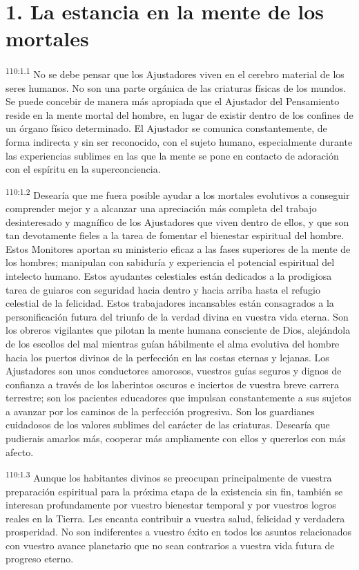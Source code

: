 \documentclass[twoside, 11pt]{book}
\begin{document}
\section*{1. La estancia en la mente de los mortales}
\par
\textsuperscript{110:1.1} No se debe pensar que los Ajustadores viven en el cerebro material de los seres humanos. No son una parte orgánica de las criaturas físicas de los mundos. Se puede concebir de manera más apropiada que el Ajustador del Pensamiento reside en la mente mortal del hombre, en lugar de existir dentro de los confines de un órgano físico determinado. El Ajustador se comunica constantemente, de forma indirecta y sin ser reconocido, con el sujeto humano, especialmente durante las experiencias sublimes en las que la mente se pone en contacto de adoración con el espíritu en la superconciencia.

\par
\textsuperscript{110:1.2} Desearía que me fuera posible ayudar a los mortales evolutivos a conseguir comprender mejor y a alcanzar una apreciación más completa del trabajo desinteresado y magnífico de los Ajustadores que viven dentro de ellos, y que son tan devotamente fieles a la tarea de fomentar el bienestar espiritual del hombre. Estos Monitores aportan su ministerio eficaz a las fases superiores de la mente de los hombres; manipulan con sabiduría y experiencia el potencial espiritual del intelecto humano. Estos ayudantes celestiales están dedicados a la prodigiosa tarea de guiaros con seguridad hacia dentro y hacia arriba hasta el refugio celestial de la felicidad. Estos trabajadores incansables están consagrados a la personificación futura del triunfo de la verdad divina en vuestra vida eterna. Son los obreros vigilantes que pilotan la mente humana consciente de Dios, alejándola de los escollos del mal mientras guían hábilmente el alma evolutiva del hombre hacia los puertos divinos de la perfección en las costas eternas y lejanas. Los Ajustadores son unos conductores amorosos, vuestros guías seguros y dignos de confianza a través de los laberintos oscuros e inciertos de vuestra breve carrera terrestre; son los pacientes educadores que impulsan constantemente a sus sujetos a avanzar por los caminos de la perfección progresiva. Son los guardianes cuidadosos de los valores sublimes del carácter de las criaturas. Desearía que pudierais amarlos más, cooperar más ampliamente con ellos y quererlos con más afecto.

\par
\textsuperscript{110:1.3} Aunque los habitantes divinos se preocupan principalmente de vuestra preparación espiritual para la próxima etapa de la existencia sin fin, también se interesan profundamente por vuestro bienestar temporal y por vuestros logros reales en la Tierra. Les encanta contribuir a vuestra salud, felicidad y verdadera prosperidad. No son indiferentes a vuestro éxito en todos los asuntos relacionados con vuestro avance planetario que no sean contrarios a vuestra vida futura de progreso eterno.
\end{document}
